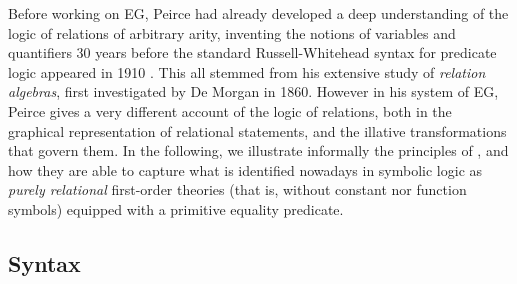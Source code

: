 Before working on EG, Peirce had already developed a deep understanding of the
logic of relations of arbitrary arity, inventing the notions of variables and
quantifiers 30 years before the standard Russell-Whitehead syntax for predicate
logic appeared in 1910 \cite{sep-peirce}. This all stemmed from his extensive
study of \emph{relation algebras}, first investigated by De Morgan in 1860.
However in his system  of EG, Peirce gives a very different account of
the logic of relations, both in the graphical representation of relational
statements, and the illative transformations that govern them. In the following,
we illustrate informally the principles of , and how they are able to
capture what is identified nowadays in symbolic logic as \emph{purely
relational} first-order theories (that is, without constant nor function
symbols) equipped with a primitive equality predicate.

\subsection{Syntax}

